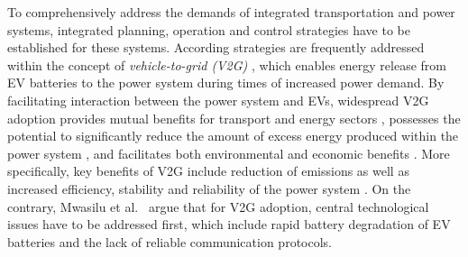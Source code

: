 To comprehensively address the demands of integrated transportation and power systems, integrated planning, operation and control strategies have to be established for these systems. According strategies are frequently addressed within the concept of \textit{vehicle-to-grid (V2G)} \cite{lund2008integration}, which enables energy release from EV batteries to the power system during times of increased power demand. By facilitating interaction between the power system and EVs, widespread V2G adoption provides mutual benefits for transport and energy sectors \cite{lund2006integrated}, possesses the potential to significantly reduce the amount of excess energy produced within the power system \cite{richardson2013electric}, and facilitates both environmental and economic benefits \cite{faria2012sustainability, mwasilu2014electric}. More specifically, key benefits of V2G include reduction of emissions as well as increased efficiency, stability and reliability of the power system \cite{yilmaz2013review}.
On the contrary, Mwasilu et al.~\cite{mwasilu2014electric} argue that for V2G adoption, central technological issues 
have to be addressed first, which include rapid battery degradation of EV batteries and the lack of reliable communication protocols.





%
